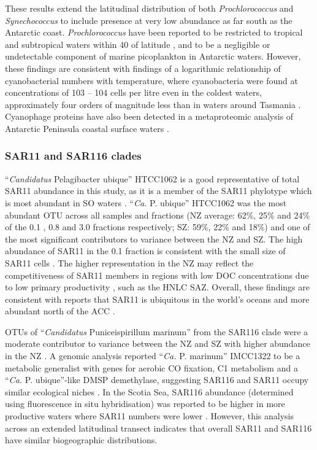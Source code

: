 These results extend the latitudinal distribution of both \emph{Prochlorococcus} and \emph{Synechococcus} to include presence at very low abundance as far south as the Antarctic coast.
\emph{Prochlorococcus} have been reported to be restricted to tropical and subtropical waters within 40\textdegree{} of latitude \cite{Partensky:1999uf}, and to be a negligible \cite{Ghiglione:2011ee} or undetectable \cite{Grzymski:2012ej} component of marine picoplankton in Antarctic waters.
However, these findings are consistent with findings of a logarithmic relationship of cyanobacterial numbers with temperature, where cyanobacteria were found at concentrations of 103 -- 104 cells per litre even in the coldest waters, approximately four orders of magnitude less than in waters around Tasmania \cite{Marchant:1987wv}.
Cyanophage proteins have also been detected in a metaproteomic analysis of Antarctic Peninsula coastal surface waters \cite{Williams:2012bs}.

\subsubsection{SAR11 and SAR116 clades}

``\emph{Candidatus} Pelagibacter ubique'' HTCC1062 is a good representative of total SAR11 abundance in this study, as it is a member of the SAR11 phylotype which is most abundant in \ac{SO} waters \cite{Brown:2012gna}.
``\emph{Ca.} P. ubique'' HTCC1062 was the most abundant \ac{OTU} across all samples and fractions (\ac{NZ} average: 62\%, 25\% and 24\% of the 0.1 \micron{}, 0.8 \micron{} and 3.0 \micron{} fractions respectively; \ac{SZ}: 59\%, 22\% and 18\%) and one of the most significant contributors to variance between the \ac{NZ} and \ac{SZ}.
The high abundance of SAR11 in the 0.1 \micron{} fraction is consistent with the small size of SAR11 cells \cite{Rappe:2002wz}.
The higher representation in the \ac{NZ} may reflect the competitiveness of SAR11 members in regions with low \ac{DOC} concentrations due to low primary productivity \cite{Giovannoni:2005ib,Alonso:2006dj}, such as the \ac{HNLC} \ac{SAZ}.
Overall, these findings are consistent with reports that SAR11 is ubiquitous in the world's oceans \cite{Mary:2006wk,Carlson:2009cc} and more abundant north of the \ac{ACC} \cite{Giebel:2009hr}.

\acp{OTU} of ``\emph{Candidatus} Puniceispirillum marinum'' from the SAR116 clade were a moderate contributor to variance between the \ac{NZ} and \ac{SZ} with higher abundance in the \ac{NZ} .
A genomic analysis reported ``\emph{Ca.} P. marinum'' IMCC1322 to be a metabolic generalist with genes for aerobic CO fixation, C1 metabolism and a ``\emph{Ca.} P. ubique''-like \ac{DMSP} demethylase, suggesting SAR116 and SAR11 occupy similar ecological niches \cite{Oh:2010di}.
In the Scotia Sea, SAR116 abundance (determined using fluorescence in situ hybridisation) was reported to be higher in more productive waters where SAR11 numbers were lower \cite{Topping:2006ul}.
However, this analysis across an extended latitudinal transect indicates that overall SAR11 and SAR116 have similar biogeographic distributions.

